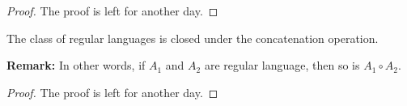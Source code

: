 \documentclass[letterpaper]{article}
\begin{document}
\begin{mdframed}[]
    \begin{proof}
        The proof is left for another day.
    \end{proof}
\end{mdframed}

\begin{theorem}{}{}
    The class of regular languages is closed under the concatenation operation.
\end{theorem}
\textbf{Remark:} In other words, if $A_1$ and $A_2$ are regular language, then so is $A_1 \circ A_2$.

\begin{mdframed}[]
    \begin{proof}
        The proof is left for another day.
    \end{proof}
\end{mdframed}
\end{document}
